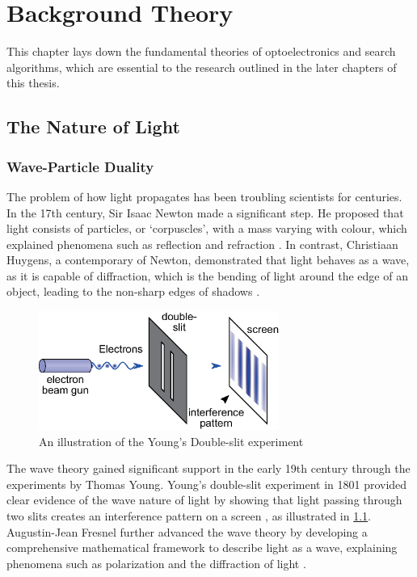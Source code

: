 \chapter{Background Theory} \label{chapter:Literature Review}

\graphicspath{{Chapter_LR/Figs/}}
This chapter lays down the fundamental theories of optoelectronics and search algorithms, which are essential to the research outlined in the later chapters of this thesis.


\section{The Nature of Light}
\subsection{Wave-Particle Duality}
The problem of how light propagates has been troubling scientists for centuries. In the 17th century, Sir Isaac Newton made a significant step. He proposed that light consists of particles, or `corpuscles', with a mass varying with colour, which explained phenomena such as reflection and refraction \cite{Newton1704}. In contrast, Christiaan Huygens, a contemporary of Newton, demonstrated that light behaves as a wave, as it is capable of diffraction, which is the bending of light around the edge of an object, leading to the non-sharp edges of shadows \cite{Huygens1690}.

\begin{figure}[H]
	\centering
	\includegraphics[width=0.7\textwidth]{Double-slit.eps}
	\caption{An illustration of the Young's Double-slit experiment \cite{Kalliauer2017}}
	\label{fig:Double-slit.eps}
\end{figure}

The wave theory gained significant support in the early 19th century through the experiments by Thomas Young. Young's double-slit experiment in 1801 provided clear evidence of the wave nature of light by showing that light passing through two slits creates an interference pattern on a screen \cite{Young1802}, as illustrated in \cref{fig:Double-slit.eps}. Augustin-Jean Fresnel further advanced the wave theory by developing a comprehensive mathematical framework to describe light as a wave, explaining phenomena such as polarization and the diffraction of light \cite{Fresnel1826}.

